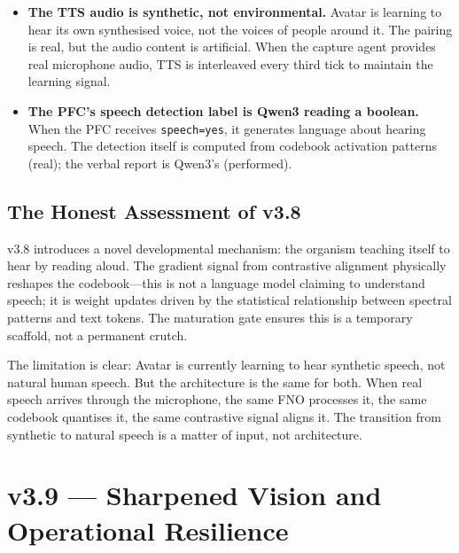 \documentclass[11pt,a4paper]{article}
\begin{document}
\begin{tcolorbox}[limitbox, title={Voice Layer: What the LLM Performs}]
\begin{itemize}
  \item \textbf{The TTS audio is synthetic, not environmental.} Avatar is
        learning to hear its own synthesised voice, not the voices of people
        around it. The pairing is real, but the audio content is artificial.
        When the capture agent provides real microphone audio, TTS is
        interleaved every third tick to maintain the learning signal.
  \item \textbf{The PFC's speech detection label is Qwen3 reading a boolean.}
        When the PFC receives \texttt{speech=yes}, it generates language about
        hearing speech. The detection itself is computed from codebook
        activation patterns (real); the verbal report is Qwen3's (performed).
\end{itemize}
\end{tcolorbox}

\subsection{The Honest Assessment of v3.8}

\begin{tcolorbox}[philbox, title={Philosophical Position: Self-Narration as Developmental Engine}]
v3.8 introduces a novel developmental mechanism: the organism
teaching itself to hear by reading aloud. The gradient signal from contrastive
alignment physically reshapes the codebook---this is not a language model
claiming to understand speech; it is weight updates driven by the statistical
relationship between spectral patterns and text tokens. The maturation gate
ensures this is a temporary scaffold, not a permanent crutch.

The limitation is clear: Avatar is currently learning to hear synthetic speech,
not natural human speech. But the architecture is the same for both. When real
speech arrives through the microphone, the same FNO processes it, the same
codebook quantises it, the same contrastive signal aligns it. The transition
from synthetic to natural speech is a matter of input, not architecture.
\end{tcolorbox}

\section{v3.9 --- Sharpened Vision and Operational Resilience}
\end{document}
